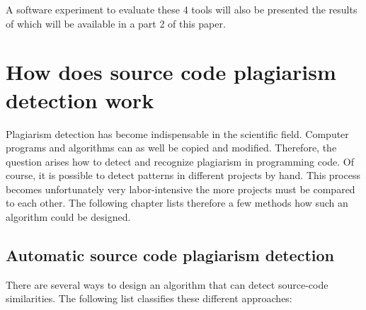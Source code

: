 \documentclass[a4paper, 11pt]{article}
\renewcommand{\\}{\vspace*{0.5\baselineskip} \newline}
\begin{document}
A software experiment to evaluate these 4 tools will also be presented the results of which will be available in a part 2 of this paper.

\clearpage

\section{How does source code plagiarism detection work}

Plagiarism detection has become indispensable in the scientific field. Computer programs and algorithms can as well be copied and modified. Therefore, the question arises how to detect and recognize plagiarism in programming code. Of course, it is possible to detect patterns in different projects by hand. This process becomes unfortunately very labor-intensive the more projects must be compared to each other. The following chapter lists therefore a few methods how such an algorithm could be designed.

\subsection{Automatic source code plagiarism detection}

There are several ways to design an algorithm that can detect source-code similarities. The following list classifies these different approaches:
\end{document}
